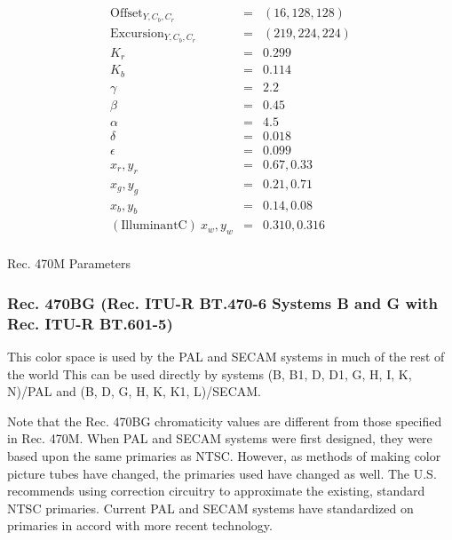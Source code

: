 \documentclass[11pt,letterpaper]{article}
\begin{document}
\begin{table}[htb]
\begin{eqnarray*}
\mathrm{Offset}_{Y,C_b,C_r}      & = & (16, 128, 128)  \\
\mathrm{Excursion}_{Y,C_b,C_r}   & = & (219, 224, 224) \\
K_r                              & = & 0.299           \\
K_b                              & = & 0.114           \\
\gamma                           & = & 2.2             \\
\beta                            & = & 0.45            \\
\alpha                           & = & 4.5             \\
\delta                           & = & 0.018           \\
\epsilon                         & = & 0.099           \\
x_r,y_r                          & = & 0.67, 0.33      \\
x_g,y_g                          & = & 0.21, 0.71      \\
x_b,y_b                          & = & 0.14, 0.08      \\
\mathrm{(Illuminant C)\ }x_w,y_w & = & 0.310, 0.316    \\
\end{eqnarray*}
\caption{Rec. 470M Parameters}
\label{tab:470m}
\end{table}

\subsubsection{Rec. 470BG (Rec. ITU-R BT.470-6 Systems B and G with Rec. ITU-R
 BT.601-5)}
\label{sec:470bg}

This color space is used by the PAL and SECAM systems in much of the rest of
 the world \cite{rec470}
This can be used directly by systems (B, B1, D, D1, G, H, I, K, N)/PAL and (B,
 D, G, H, K, K1, L)/SECAM.

Note that the Rec. 470BG chromaticity values are different from those specified
 in Rec. 470M.
When PAL and SECAM systems were first designed, they were based upon the same
 primaries as NTSC.
However, as methods of making color picture tubes have changed, the primaries
 used have changed as well.
The U.S. recommends using correction circuitry to approximate the existing,
 standard NTSC primaries.
Current PAL and SECAM systems have standardized on primaries in accord with
 more recent technology.
\end{document}
